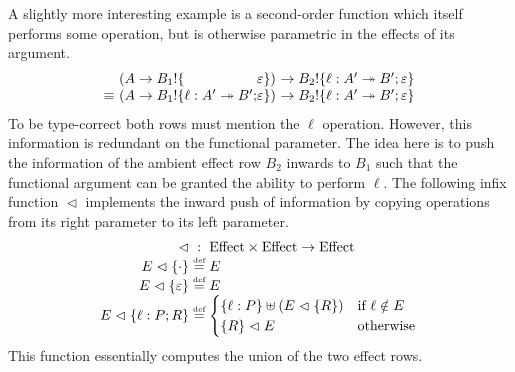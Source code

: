 \documentclass[12pt,phd,lfcs,twoside,openright,logo,leftchapter,normalheadings]{infthesis}
\theoremstyle{plain}
\theoremstyle{definition}
\begin{document}
A slightly more interesting example is a second-order function which
itself performs some operation, but is otherwise parametric in the
effects of its argument.
%
\[
  \ba{@{~}l@{~}l@{}l@{~}l}
        &(A \to B_1 \eff \{                   &\varepsilon\}) &\to B_2 \eff \{\ell : A' \opto B';\varepsilon\}\\
  \equiv&(A \to B_1 \eff \{\ell : A' \opto B';&\varepsilon\}) &\to B_2 \eff \{\ell : A' \opto B';\varepsilon\}
  \ea
\]
%
To be type-correct both rows must mention the $\ell$
operation. However, this information is redundant on the functional
parameter.  The idea here is to push the information of the ambient
effect row $B_2$ inwards to $B_1$ such that the functional argument
can be granted the ability to perform $\ell$.
%
The following infix function $\vartriangleleft$ implements the inward
push of information by copying operations from its right parameter to
its left parameter.
%
\[
\ba{@{~}r@{~}c@{~}l}
  \vartriangleleft &:& \EffectCat \times \EffectCat \to \EffectCat\\
  E \vartriangleleft \{\cdot\} &\defas& E\\
  E \vartriangleleft \{\varepsilon\} &\defas& E\\
  E \vartriangleleft \{\ell : P;R\} &\defas&
  \begin{cases}
    \{\ell : P\} \uplus (E \vartriangleleft \{R\}) & \text{if } \ell \notin E\\
    \{R\} \vartriangleleft E & \text{otherwise}
  \end{cases}\\
\ea
\]
%
This function essentially computes the union of the two effect rows.
\end{document}
